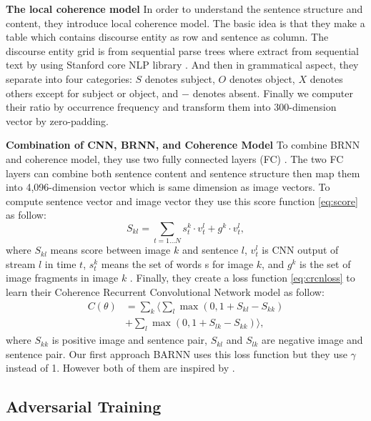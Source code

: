 \documentclass[11pt]{article}
\begin{document}
{\bf The local coherence model} In order to understand the sentence structure and content, they introduce local coherence model. The basic idea is that they make a table which contains discourse entity as row and sentence as column. The discourse entity grid is from sequential parse trees where extract from sequential text by using Stanford core NLP library \cite{manningetal2014}. And then in grammatical aspect, they separate into four categories: $S$ denotes subject, $O$ denotes object, $X$ denotes others except for subject or object, and $-$ denotes absent. Finally we computer their ratio by occurrence frequency and transform them into 300-dimension vector by zero-padding.

{\bf  Combination of CNN, BRNN, and Coherence Model} To combine BRNN and coherence model, they use two fully connected layers (FC) \cite{Barzilay:2008:MLC:1350986.1350987}. The two FC layers can combine both sentence content and sentence structure then map them into 4,096-dimension vector which is same dimension as image vectors. To compute sentence vector and image vector they use this score function \ref{eq:score}  \cite{Karpathy_2015_CVPR} as follow:
\begin{equation}
S_{kl} = \sum_{t = 1 \ldots N} s_{t}^{k} \cdot v_{t}^{l} + g^{k} \cdot v_{t}^{l},
\label{eq:score}
\end{equation}
where $S_{kl}$ means score between image $k$ and sentence $l$, $v_{t}^{l}$ is CNN output of stream $l$ in time $t$, $s_{t}^{k}$ means the set of words s for image $k$, and $g^{k}$ is the set of image fragments in image $k$ \cite{Karpathy:2014:DFE:2969033.2969038}. Finally, they create a loss function \ref{eq:crcnloss} to learn their Coherence Recurrent Convolutional Network model as follow:
\begin{equation}
\begin{aligned}
C(\theta) &= \sum_k \langle \sum_l \max (0, 1 + S_{kl} - S_{kk}) \\
&+ \sum_l \max (0, 1 + S_{lk} - S_{kk})\rangle,
\end{aligned}
\label{eq:crcnloss}
\end{equation}
where $S_{kk}$ is positive image and sentence pair, $S_{kl}$ and $S_{lk}$ are negative image and sentence pair. Our first approach BARNN uses this loss function but they use $\gamma$ instead of 1. However both of them are inspired by \cite{Karpathy:2014:DFE:2969033.2969038}. 

\subsection{Adversarial Training}
\end{document}

